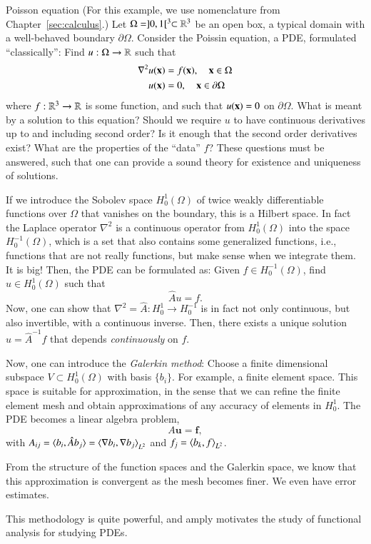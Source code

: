 \begin{myExample}{Poisson equation}{}
(For this example, we use nomenclature from Chapter~\ref{sec:calculus}.)
Let $\Omega = ]0,1[^3 \subset\mathbb{R}^3$ be an open box, a typical domain with a well-behaved boundary $\partial\Omega$.
Consider the Poissin equation, a PDE, formulated ``classically'': Find $u : \Omega \to \mathbb{R}$ such that
\begin{align}
 \nabla^2 u(\mathbf{x}) &= f(\mathbf{x}), 
  \quad \mathbf{x} \in \Omega \\
 u(\mathbf{x}) &= 0, \quad \mathbf{x}\in\partial\Omega
\end{align}
where $f : \mathbb{R}^3\to \mathbb{R}$ is some function,
and such that $u(\mathbf{x}) = 0$ on $\partial\Omega$. What is meant by a solution to this equation? Should we require $u$ to have continuous derivatives up to and including second order? Is it enough that the second order derivatives exist? What are the properties of the ``data'' $f$? These questions must be answered, such that one can provide a sound theory for existence and uniqueness of solutions.

If we introduce the Sobolev space $H^1_0(\Omega)$ of twice weakly differentiable functions over $\Omega$ that vanishes on the boundary, this is a Hilbert space. In fact the Laplace operator $\nabla^2$ is a continuous operator from $H^1_0(\Omega)$ into the space $H^{-1}_0(\Omega)$, which is a set that also contains some generalized functions, i.e., functions that are not really functions, but make sense when we integrate them. It is big! Then, the PDE can be formulated as: Given $f \in H^{-1}_0(\Omega)$, find $u \in H^1_0(\Omega)$ such that 
\begin{equation}
 \hat{A} u = f. 
\end{equation}
Now, one can show that $\nabla^2 = \hat{A} : H^1_0\to H^{-1}_0$ is in fact not only continuous, but also invertible, with a continuous inverse. Then, there exists a unique solution $u = \hat{A}^{-1} f$ that depends \emph{continuously} on $f$. 

Now, one can introduce the \emph{Galerkin method}: Choose a finite dimensional subspace $V \subset H^1_0(\Omega)$ with basis $\{b_i\}$. For example, a finite element space. This space is suitable for approximation, in the sense that we can refine the finite element mesh and obtain approximations of any accuracy of elements in $H^1_0$. The PDE becomes a linear algebra problem,
\begin{equation}
    A \mathbf{u} = \mathbf{f},
\end{equation}
with $A_{ij} = \braket{b_i,\hat{A} b_j} = \braket{\nabla b_i,\nabla b_j}_{L^2}$ and $f_j = \braket{b_k, f}_{L^2}$.

From the structure of the function spaces and the Galerkin space, we know that this approximation is convergent as the mesh becomes finer. We even have error estimates.

This methodology is quite powerful, and amply motivates the study of functional analysis for studying PDEs.
\end{myExample}

